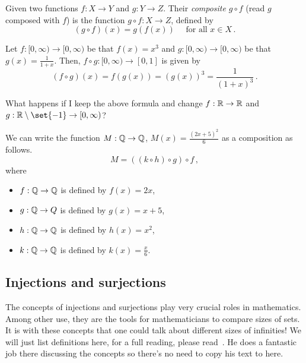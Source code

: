 \begin{definition}
    Given two functions $f: X\to Y$ and $g: Y \to Z$. Their \emph{composite} $g\circ f$ 
    (read $g$ composed with $f$) is the function $g\circ f: X\to Z$, defined by
    \begin{equation*}
        (g\circ f)(x) = g(f(x)) \quad \text{ for all } x\in X\,.
    \end{equation*}
\end{definition}

\begin{example}
    Let $f:[0,\infty) \to [0,\infty)$ be that $f(x) = x^3$ and $g: [0,\infty) \to [0,\infty)$ be that
    $g(x) = \frac{1}{1+ x}$.
    Then, $f\circ g: [0,\infty) \to [0,1]$ is given by
    \begin{equation*}
        (f\circ g)(x) = f(g(x)) = (g(x))^3 = \frac{1}{(1+ x)^3}\,.
    \end{equation*}

    What happens if I keep the above formula and change
    $f:\mathbb{R} \to \mathbb{R}$ and $g: \R\setminus\set{-1} \to [0,\infty)$?
\end{example}

\begin{example}
    We can write the function $M: \mathbb{Q} \to \mathbb{Q}$, $M(x) = \frac{(2x+ 5)^2}{6}$ 
    as a composition as follows.
    \begin{equation*}
        M = ((k\circ h) \circ g)\circ f \,,
    \end{equation*}
    where 
    \begin{itemize}
        \item $f:\mathbb{Q} \to \mathbb{Q}$ is defined by $f(x) = 2x$,
        \item $g: \mathbb{Q} \to Q$ is defined by $g(x) = x + 5$,
        \item $h: \mathbb{Q} \to \mathbb{Q}$ is defined by $h(x) = x^2$,
        \item $k:\mathbb{Q} \to \mathbb{Q}$ is defined by $k(x) =  \frac{x}{6}$.
    \end{itemize}
\end{example}


\subsection{Injections and surjections}

The concepts of injections and surjections play very crucial roles in mathematics.
Among other use, they are the tools for mathematicians to compare sizes of sets.
It is with these concepts that one could talk about different sizes of infinities!
We will just list definitions here, for a full reading, please read~\cite{Newstead}.
He does a fantastic job there discussing the concepts so there's no need to copy
his text to here.
    
